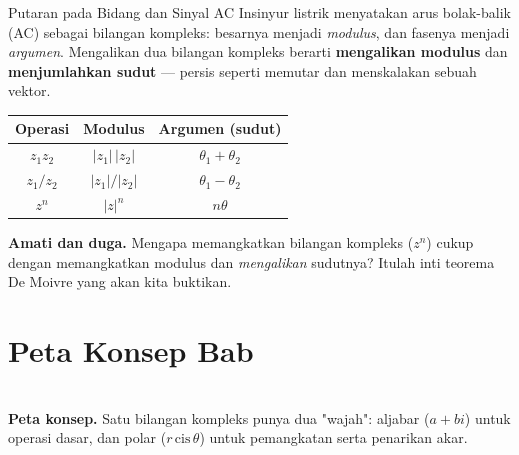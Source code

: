\documentclass[11pt,a4paper]{report}
\theoremstyle{gaya}
\begin{document}
\begin{studikasus}{Putaran pada Bidang dan Sinyal AC}
Insinyur listrik menyatakan arus bolak-balik (AC) sebagai bilangan kompleks: besarnya menjadi \emph{modulus}, dan fasenya menjadi \emph{argumen}. Mengalikan dua bilangan kompleks berarti \textbf{mengalikan modulus} dan \textbf{menjumlahkan sudut} --- persis seperti memutar dan menskalakan sebuah vektor.
\begin{center}
\begin{tabular}{c|c|c}
\toprule
Operasi & Modulus & Argumen (sudut) \\
\midrule
$z_1 z_2$ & $|z_1|\,|z_2|$ & $\theta_1+\theta_2$ \\
$z_1/z_2$ & $|z_1|/|z_2|$ & $\theta_1-\theta_2$ \\
$z^n$ & $|z|^n$ & $n\theta$ \\
\bottomrule
\end{tabular}
\end{center}
\textbf{Amati dan duga.} Mengapa memangkatkan bilangan kompleks ($z^n$) cukup dengan memangkatkan modulus dan \emph{mengalikan} sudutnya? Itulah inti teorema De Moivre yang akan kita buktikan.
\end{studikasus}

\section*{Peta Konsep Bab}
\begin{center}
\\
\small \textbf{Peta konsep.} Satu bilangan kompleks punya dua "wajah": aljabar ($a+bi$) untuk operasi dasar, dan polar ($r\,\mathrm{cis}\,\theta$) untuk pemangkatan serta penarikan akar.
\end{center}
\end{document}
